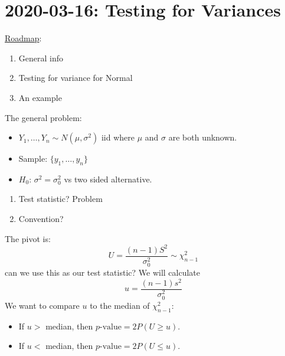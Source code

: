 \section{2020-03-16: Testing for Variances}
\underline{Roadmap}:
\begin{enumerate}[label=(\roman*)]
    \item General info
    \item Testing for variance for Normal
    \item An example
\end{enumerate}
The general problem:
\begin{itemize}
    \item $ Y_1,\ldots ,Y_n \sim N(\mu,\sigma^2)$ iid
          where $ \mu $ and $ \sigma $ are both unknown.
    \item Sample: $ \{y_1,\ldots ,y_n\} $
    \item $ H_0 $: $ \sigma^2=\sigma_0^2 $ vs two sided alternative.
\end{itemize}

\begin{enumerate}[label=(\roman*)]
    \item Test statistic? Problem
    \item Convention?
\end{enumerate}
The pivot is:
\[ U=\frac{(n-1)S^2}{\sigma_0^2} \sim \chi^2_{n-1} \]
can we use this as our test statistic? We will calculate
\[ u=\frac{(n-1)s^2}{\sigma_0^2} \]
We want to compare $ u $ to the median of $ \chi^2_{n-1} $:
\begin{itemize}
    \item If $ u> $ median, then $ p\text{-value}=2P(U\geqslant u) $.
    \item If $ u< $ median, then $ p\text{-value}=2P(U\leqslant u) $.
\end{itemize}

